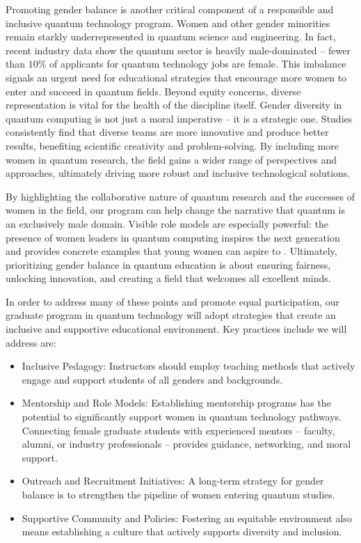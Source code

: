 \documentclass{scrreprt}
\begin{document}
Promoting gender balance is another critical component of a
responsible and inclusive quantum technology program. Women and other
gender minorities remain starkly underrepresented in quantum science
and engineering. In fact, recent industry data show the quantum sector
is heavily male-dominated – fewer than $10\%$ of applicants for quantum
technology jobs are female. This imbalance signals an urgent need for
educational strategies that encourage more women to enter and succeed
in quantum fields. Beyond equity concerns, diverse representation is
vital for the health of the discipline itself. Gender diversity in
quantum computing is not just a moral imperative – it is  a strategic one. 
Studies consistently find that diverse teams are more innovative and
produce better results, benefiting scientific creativity and
problem-solving. By including more women in quantum research, the field
gains a wider range of perspectives and approaches, ultimately driving
more robust and inclusive technological solutions.


By highlighting the collaborative nature of quantum research and the
successes of women in the field, our program can help change the
narrative that quantum is an exclusively male domain. Visible role
models are especially powerful: the presence of women leaders in
quantum computing inspires the next generation and provides concrete
examples that young women can aspire to . Ultimately, prioritizing
gender balance in quantum education is about ensuring fairness,
unlocking innovation, and creating a field that welcomes all excellent
minds.

In order to address many of these points and promote equal
participation, our graduate program in quantum technology will adopt
strategies that create an inclusive and supportive educational
environment. Key practices include we will address are:

\begin{itemize}
\item Inclusive Pedagogy: Instructors should employ teaching methods that actively engage and support students of all genders and backgrounds.
\item Mentorship and Role Models: Establishing mentorship programs has the potential to  significantly support women in quantum technology pathways. Connecting female graduate students with experienced mentors – faculty, alumni, or industry professionals – provides guidance, networking, and moral support. 
\item Outreach and Recruitment Initiatives: A long-term strategy for gender balance is to strengthen the pipeline of women entering quantum studies. 
\item Supportive Community and Policies: Fostering an equitable environment also means establishing a culture that actively supports diversity and inclusion. 
\end{itemize}
\end{document}
